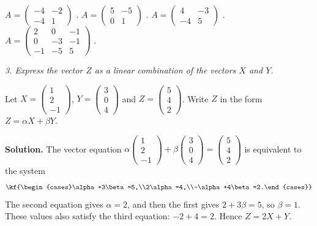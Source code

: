 \begin{tasks}
\task $A = \begin{pmatrix} -4 & -2 \\ -4 & 1 \end{pmatrix}$ .
\task $A = \begin{pmatrix} 5 & -5 \\ 0 & 1 \end{pmatrix}$ .
\task $A = \begin{pmatrix} 4 & -3 \\ -4 & 5 \end{pmatrix}$ .
\task $A = \begin{pmatrix} 2 & 0 & -1 \\ 0 & -3 & -1 \\ -1 & -5 & 5 \end{pmatrix}$ .
\end{tasks}
\emph{3. Express the vector $Z$ as a linear combination of the vectors $X$ and $Y$.}
\begin{misol}
Let $X=\begin{pmatrix}1\\2\\-1\end{pmatrix}$, $Y=\begin{pmatrix}3\\0\\4\end{pmatrix}$ and $Z=\begin{pmatrix}5\\4\\2\end{pmatrix}$. Write $Z$ in the form $Z=\alpha X+\beta Y$.

\textbf{Solution.} The vector equation $\alpha\begin{pmatrix}1\\2\\-1\end{pmatrix}+\beta\begin{pmatrix}3\\0\\4\end{pmatrix}=\begin{pmatrix}5\\4\\2\end{pmatrix}$ is equivalent to the system
\[\kf{\begin{cases}\alpha+3\beta=5,\\2\alpha=4,\\-\alpha+4\beta=2.\end{cases}}\]
The second equation gives $\alpha=2$, and then the first gives $2+3\beta=5$, so
$\beta=1$. These values also satisfy the third equation: $-2+4=2$.
Hence $Z=2X+Y$.
\end{misol}
